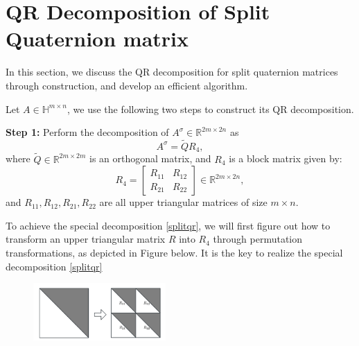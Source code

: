 \documentclass[3p]{elsarticle}
\numberwithin{equation}{section}
\begin{document}
\section{QR Decomposition of Split Quaternion matrix}
In this section, we discuss the QR decomposition for split quaternion matrices through construction, and develop an efficient algorithm.

Let $A \in \mathbb{H}^{m \times n}$, we use the following two steps to construct its QR decomposition.  

\textbf{Step 1:} Perform the decomposition of $A^\sigma \in \mathbb{R}^{2m \times 2n}$ as 
\begin{equation}\label{splitqr}
A^\sigma = \widetilde{Q} R_4,
\end{equation} 
where $\widetilde{Q} \in \mathbb{R}^{2m\times 2m}$ is an orthogonal matrix, and $R_4  $ is a block matrix given by:
\begin{equation}\label{r4}
R_4 = \begin{bmatrix}
    R_{11} & R_{12} \\
    R_{21} & R_{22}
\end{bmatrix} \in \mathbb{R}^{2m \times 2n},
\end{equation}
and $R_{11}, R_{12},R_{21},R_{22}$ are all upper triangular matrices of size $m \times n$.

To achieve the special decomposition \eqref{splitqr},  we will first figure out how to transform an upper triangular matrix $R$ into $R_4$ through permutation transformations, as depicted in Figure below. It is the key to realize the special decomposition \eqref{splitqr}
\begin{figure}[htbp]
        \centering
        \includegraphics[width=0.45\textwidth,keepaspectratio=true]{Upper triangular.png} %
         \label{fig:Upper triangular}
\end{figure}
\end{document}
